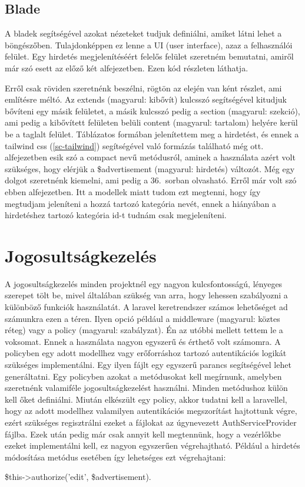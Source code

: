 \documentclass[]{thesis-ekf}
\theoremstyle{definition}
\theoremstyle{remark}
\begin{document}
	\subsection{Blade}\label{sc-blade}
		A bladek segítségével azokat nézeteket tudjuk definiálni, amiket látni lehet a böngészőben. Tulajdonképpen ez lenne a UI (user interface), azaz a felhasználói felület. Egy hirdetés megjelenítéséért felelős felület szeretném bemutatni, amiről már szó esett az előző két alfejezetben. Ezen  kód részleten láthatja.
		
		
	
		Erről csak röviden szeretnénk beszélni, rögtön az elején van ként részlet, ami említésre méltó. Az extends (magyarul: kibővít) kulcsszó segítségével kitudjuk bővíteni egy másik felületet, a másik kulcsszó pedig a section (magyarul: szekció), ami pedig a kibővített felületen belüli content (magyarul: tartalom) helyére kerül be a taglalt felület. Táblázatos formában jelenítettem meg a hirdetést, és ennek a tailwind css (\ref{sc-tailwind}) segítségével való formázás található még ott.  alfejezetben esik szó a compact nevű metódusról, aminek a használata azért volt szükséges, hogy elérjük a \$advertisement (magyarul: hirdetés) változót. Még egy dolgot szeretnénk kiemelni, ami pedig a 36.~sorban olvasható. Erről már volt szó ebben  alfejezetben. Itt a modellek miatt tudom ezt megtenni, hogy így megtudjam jeleníteni a hozzá tartozó kategória nevét, ennek a hiányában a hirdetéshez tartozó kategória id-t tudnám csak megjeleníteni.
	\section{Jogosultságkezelés}
		A jogosultságkezelés minden projektnél egy nagyon kulcsfontosságú, lényeges szerepet tölt be, mivel általában szükség van arra, hogy lehessen szabályozni a különböző funkciók használatát. A laravel keretrendszer számos lehetőséget ad számunkra ezen a téren. Ilyen opció például a middleware (magyarul: köztes réteg) vagy a policy (magyarul: szabályzat). Én az utóbbi mellett tettem le a voksomat. Ennek a használata nagyon egyszerű és érthető volt számomra. A policyben egy adott modellhez vagy erőforráshoz tartozó autentikációs logikát szükséges implementálni. Egy ilyen fájlt egy egyszerű parancs segítségével lehet generáltatni. Egy policyben azokat a metódusokat kell megírnunk, amelyben szeretnénk valamiféle jogosultságkezelést használni. Minden metódushoz külön kell őket definiálni. Miután elkészült egy policy, akkor tudatni kell a laravellel, hogy az adott modellhez valamilyen autentikációs megszorítást hajtottunk végre, ezért szükséges regisztrálni ezeket a fájlokat az úgynevezett AuthServiceProvider fájlba. Ezek után pedig már csak annyit kell megtennünk, hogy a vezérlőkbe ezeket implementálni kell, ez nagyon egyszerűen végrehajtható. Például a hirdetés módosítása metódus esetében így lehetséges ezt végrehajtani: 
		\begin{center}
			\$this->authorize('edit', \$advertisement).
		\end{center}
		\cite{Laravel}
\end{document}
